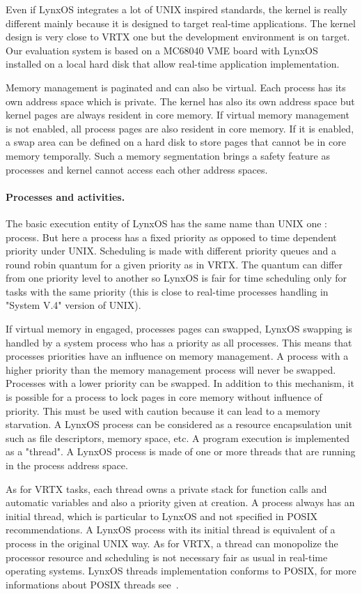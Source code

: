 \documentclass[10pt]{report}
\begin{document}
Even if LynxOS integrates a lot of UNIX inspired standards, the kernel is really different mainly because it is designed
to target real-time applications. The kernel design is very close to VRTX one but the development environment is on target.
Our evaluation system is based on a MC68040 VME board with LynxOS installed on a local hard disk that allow real-time
application implementation.

Memory management is paginated and can also be virtual. Each process has its own address space which is private. The kernel has
also its own address space but kernel pages are always resident in core memory. If virtual memory management is not enabled,
all process pages are also resident in core memory. If it is enabled, a swap area can be defined on a hard disk to store
pages that cannot be in core memory temporally. Such a memory segmentation brings a safety feature as processes and kernel
cannot access each other address spaces.

\paragraph{Processes and activities.} The basic execution entity of LynxOS has the same name than UNIX one : process. But here
a process has a fixed priority as opposed to time dependent priority under UNIX. Scheduling is made with different priority
queues and a round robin quantum for a given priority as in VRTX. The quantum can differ from one priority level to another
so LynxOS is fair for time scheduling only for tasks with the same priority (this is close to real-time processes handling
in "System V.4" version of UNIX).

If virtual memory in engaged, processes pages can swapped, LynxOS swapping is handled by a system process who has a priority
as all processes. This means that processes priorities have an influence on memory management. A process with a higher priority
than the memory management process will never be swapped. Processes with a lower priority can be swapped. In addition to this
mechanism, it is possible for a process to lock pages in core memory without influence of priority. This must be used with
caution because it can lead to a memory starvation. A LynxOS process can be considered as a resource encapsulation unit such
as file descriptors, memory space, etc. A program execution is implemented as a "thread". A LynxOS process is made of one or
more threads that are running in the process address space.

As for VRTX tasks, each thread owns a private stack for function calls and automatic variables and also a priority given at
creation. A process always has an initial thread, which is particular to LynxOS and not specified in POSIX recommendations.
A LynxOS process with its initial thread is equivalent of a process in the original UNIX way. As for VRTX, a thread can
monopolize the processor resource and scheduling is not necessary fair as usual in real-time operating systems. LynxOS
threads implementation conforms to POSIX, for more informations about POSIX threads see~\cite{JMR:94}.
\end{document}
